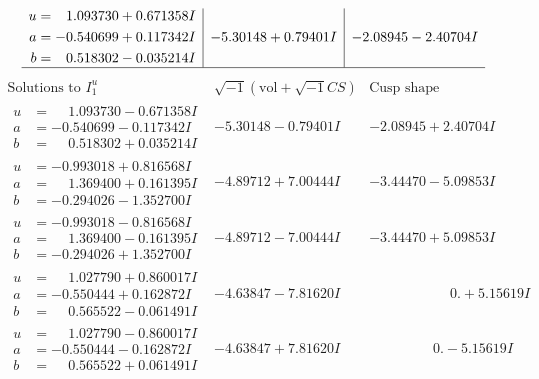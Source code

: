 \documentclass[1p]{elsarticle_modified}
\theoremstyle{definition}
\newcommand{\I}{\sqrt{-1}}
\begin{document}
$$\begin{array}{c|c|c}
\begin{aligned}
u &= \phantom{-}1.093730 + 0.671358 I \\
a &= -0.540699 + 0.117342 I \\
b &= \phantom{-}0.518302 - 0.035214 I\end{aligned}
 & -5.30148 + 0.79401 I & -2.08945 - 2.40704 I\\
 \hline 
 \end{array}$$\newpage$$\begin{array}{c|c|c}  
\text{Solutions to }I^u_{1}& \I (\text{vol} + \sqrt{-1}CS) & \text{Cusp shape}\\
 \hline 
\begin{aligned}
u &= \phantom{-}1.093730 - 0.671358 I \\
a &= -0.540699 - 0.117342 I \\
b &= \phantom{-}0.518302 + 0.035214 I\end{aligned}
 & -5.30148 - 0.79401 I & -2.08945 + 2.40704 I \\ \hline\begin{aligned}
u &= -0.993018 + 0.816568 I \\
a &= \phantom{-}1.369400 + 0.161395 I \\
b &= -0.294026 - 1.352700 I\end{aligned}
 & -4.89712 + 7.00444 I & -3.44470 - 5.09853 I \\ \hline\begin{aligned}
u &= -0.993018 - 0.816568 I \\
a &= \phantom{-}1.369400 - 0.161395 I \\
b &= -0.294026 + 1.352700 I\end{aligned}
 & -4.89712 - 7.00444 I & -3.44470 + 5.09853 I \\ \hline\begin{aligned}
u &= \phantom{-}1.027790 + 0.860017 I \\
a &= -0.550444 + 0.162872 I \\
b &= \phantom{-}0.565522 - 0.061491 I\end{aligned}
 & -4.63847 - 7.81620 I & \phantom{-0.000000 -}0. + 5.15619 I \\ \hline\begin{aligned}
u &= \phantom{-}1.027790 - 0.860017 I \\
a &= -0.550444 - 0.162872 I \\
b &= \phantom{-}0.565522 + 0.061491 I\end{aligned}
 & -4.63847 + 7.81620 I & \phantom{-0.000000 } 0. - 5.15619 I \\ \hline\begin{aligned}

\end{aligned}
\end{array}$$
\end{document}
